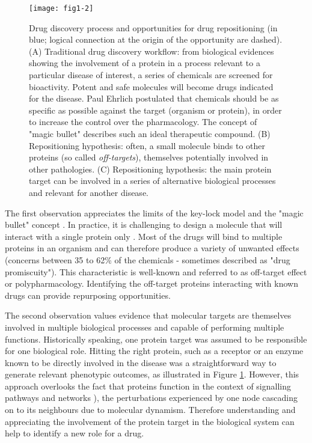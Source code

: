 \begin{figure}[ht]
    \centering
    \texttt{[image: fig1-2]}
    \caption{Drug discovery process and opportunities for drug repositioning (in blue; logical connection at the origin of the opportunity are dashed). (A) Traditional drug discovery workflow: from biological evidences showing the involvement of a protein in a process relevant to a particular disease of interest, a series of chemicals are screened for bioactivity. Potent and safe molecules will become drugs indicated for the disease. Paul Ehrlich postulated that chemicals should be as specific as possible against the target (organism or protein), in order to increase the control over the pharmacology. The concept of "magic bullet" describes such an ideal therapeutic compound. (B) Repositioning hypothesis: often, a small molecule binds to other proteins (so called \emph{off-targets}), themselves potentially involved in other pathologies. (C) Repositioning hypothesis: the main protein target can be involved in a series of alternative biological processes and relevant for another disease.}
    \label{fig1-2}
\end{figure}

The first observation appreciates the limits of the key-lock model and the "magic bullet" concept \citep{ehrlichwiki}. In practice, it is  challenging to design a molecule that will interact with a single protein only \citep{paolini2006global} \citep{li2010pubchem}. Most of the drugs will bind to multiple proteins in an organism and can therefore produce a variety of unwanted effects (concerns between 35 to 62\% of the chemicals - sometimes described as "drug promiscuity"). This characteristic is well-known and referred to as off-target effect or polypharmacology. Identifying the off-target proteins interacting with known drugs can provide repurposing opportunities.

The second observation values evidence that molecular targets are themselves involved in multiple biological processes and capable of performing multiple functions. Historically speaking, one protein target was assumed to be responsible for one biological role. Hitting the right protein, such as a receptor or an enzyme known to be directly involved in the disease was a straightforward way to generate relevant phenotypic outcomes, as illustrated in Figure \ref{fig1-2}. However, this approach overlooks the fact that proteins function in the context of signalling pathways and networks \citep{hopkins2008network} \citep{barabasi2004network}), the perturbations experienced by one node cascading on to its neighbours due to molecular dynamism. Therefore understanding and appreciating the involvement of the protein target in the biological system can help to identify a new role for a drug.

